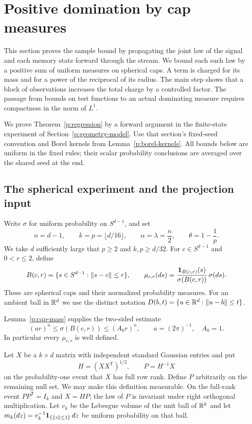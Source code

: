 \section{Positive domination by cap measures}\label{p:cap-section}

This section proves the sample bound by propagating the joint law of the
signal and each memory state forward through the stream.  We bound each
such law by a positive sum of uniform measures on spherical caps.  A term
is charged for its mass and for a power of the reciprocal of its radius.
The main step shows that a block of observations increases the total charge
by a controlled factor.  The passage from bounds on test functions to an
actual dominating measure requires compactness in the norm of $L^1$.

We prove Theorem~\ref{p:regression} by a forward argument in the
finite-state experiment of Section~\ref{p:geometry-model}. Use that
section's fixed-seed convention and Borel kernels from
Lemma~\ref{p:borel-kernels}. All bounds below are uniform in the fixed
rules; their scalar probability conclusions are averaged over the shared
seed at the end.

\subsection{The spherical experiment and the projection input}

Write $\sigma$ for uniform probability on $S^{d-1}$, and set
\begin{equation}\label{p:cap-parameters}
 n=d-1,\qquad k=p=\lfloor d/16\rfloor,\qquad
 \alpha=\lambda=\frac n2,\qquad \theta=1-\frac1p.
\end{equation}
We take $d$ sufficiently large that $p\ge2$ and $k,p\ge d/32$.
For $c\in S^{d-1}$ and $0<r\le2$, define
\[
 B(c,r)=\{s\in S^{d-1}:\left\lVert s-c\right\rVert\le r\},\qquad
 \mu_{c,r}(ds)=\frac{\mathbf 1_{B(c,r)}(s)}{\sigma(B(c,r))}\,\sigma(ds).
\]
These are spherical caps and their normalized probability measures.
For an ambient ball in $\mathbb R^d$ we use the distinct notation
$D(b,t)=\{u\in\mathbb R^d:\left\lVert u-b\right\rVert\le t\}$.

Lemma~\ref{p:cap-mass} supplies the two-sided estimate
\begin{equation}\label{p:cap-volume-bound}
 (ar)^n\le\sigma(B(c,r))\le(A_0r)^n,
 \qquad a=(2\pi)^{-1},\quad A_0=1.
\end{equation}
In particular every $\mu_{c,r}$ is well defined.

Let $X$ be a $k\times d$ matrix with independent standard Gaussian
entries and put
\[
 H=(XX^{\mathsf T})^{1/2},\qquad P=H^{-1}X
\]
on the probability-one event that $X$ has full row rank.  Define $P$
arbitrarily on the remaining null set.  We may make this definition
measurable.  On the full-rank event $PP^{\mathsf T}=I_k$ and $X=HP$;
the law of $P$ is
invariant under right orthogonal multiplication.  Let
$v_k$ be the Lebesgue volume of the unit ball of $\mathbb R^k$ and let
$m_k(dz)=v_k^{-1}\mathbf 1_{\{\left\lVert z\right\rVert\le1\}}\,dz$ be uniform probability on
that ball.

